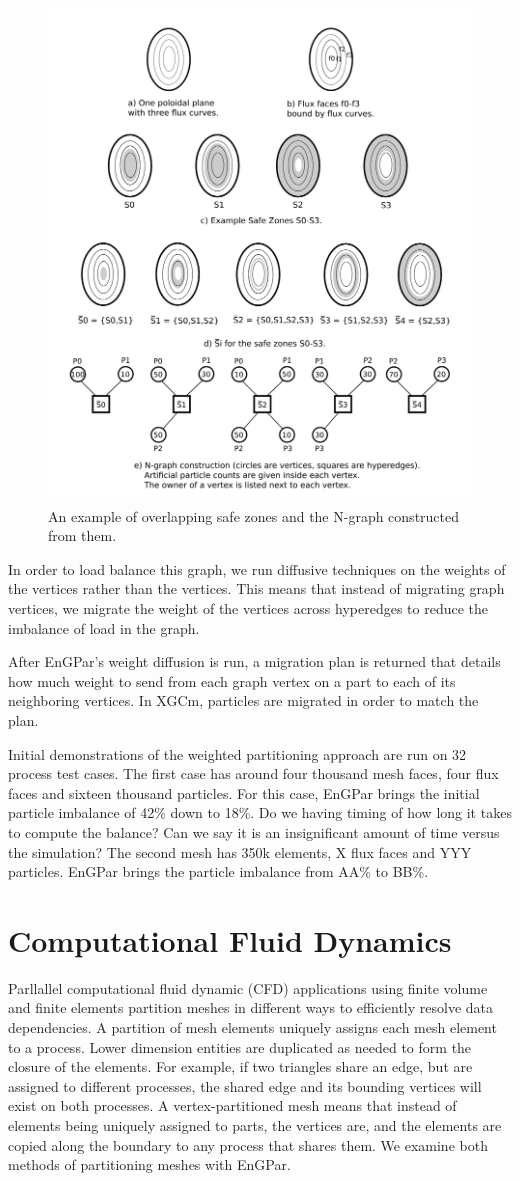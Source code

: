 \documentclass[conference]{IEEEtran}
\begin{document}
\begin{figure}[!ht]
  \centering
  \includegraphics[width=.4\textwidth]{../figures/xgcm_ngraph_construction.png}
  \caption{An example of overlapping safe zones and the N-graph constructed from them.}
  \label{fig:sbars}
\end{figure}

In order to load balance this graph, we run diffusive techniques on the weights of the vertices
rather than the vertices. This means that instead of migrating graph vertices, we migrate the
weight of the vertices across hyperedges to reduce the imbalance of load in the graph.

After EnGPar's weight diffusion is run, a migration plan is returned that details how
much weight to send from each graph vertex on a part to each of its neighboring vertices.
In XGCm, particles are migrated in order to match the plan.

Initial demonstrations of the weighted partitioning approach are run on 32
process test cases.
The first case has around four thousand
mesh faces, four flux faces and sixteen thousand particles. For this case, EnGPar brings the
initial particle imbalance of 42\% down to 18\%. {\color{red} Do we having
timing of how long it takes to compute the balance?  Can we say it is an
insignificant amount of time versus the simulation?}
The second mesh has 350k elements, X flux faces and YYY particles. EnGPar brings the
particle imbalance from AA\% to BB\%.

\section{Computational Fluid Dynamics}

Parllallel computational fluid dynamic (CFD) applications using
finite volume and finite elements partition meshes in different
ways to efficiently resolve data dependencies.
A partition of mesh elements uniquely assigns each mesh element to a process.
Lower dimension entities are duplicated as needed to form the closure of the
elements.
For example, if two triangles share an edge, but are assigned to different
processes, the shared edge and its bounding vertices will exist on both
processes.
A vertex-partitioned mesh means that
instead of elements being uniquely assigned to parts, the vertices are, and the elements are
copied along the boundary to any process that shares them. We examine both methods of
partitioning meshes with EnGPar.
\end{document}
